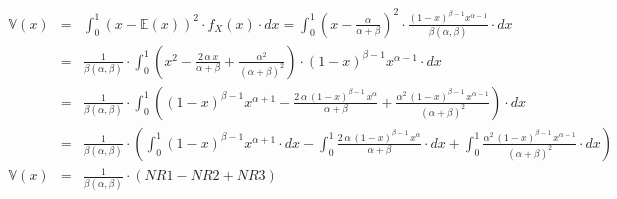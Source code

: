 \begin{uebsp}
\begin{Answer}
\begin{enumerate}[i)]
            \begin{eqnarray*}
                \mathbb{V}(x) &=& \int_{0}^1 (x-\mathbb{E}(x))^2\cdot f_X(x)\cdot dx = \int_{0}^1 \left(x-\frac{\alpha}{\alpha+\beta}\right)^2\cdot \frac{(1-x)^{\beta-1} x^{\alpha-1}}{\beta(\alpha, \beta)}\cdot dx \\
                 &=& \frac{1}{\beta(\alpha, \beta)}\cdot \int_{0}^1 \left(x^2-\frac{2\,\alpha\,x}{\alpha+\beta} + \frac{\alpha^2}{(\alpha+\beta)^2}\right)\cdot (1-x)^{\beta-1} x^{\alpha-1}\cdot dx \\
                 &=& \frac{1}{\beta(\alpha, \beta)}\cdot \int_{0}^1\left((1-x)^{\beta-1} x^{\alpha+1} - \frac{2\,\alpha\,(1-x)^{\beta-1}\,x^{\alpha}}{\alpha+\beta} + \frac{\alpha^2\,(1-x)^{\beta-1}\,x^{\alpha-1}}{(\alpha+\beta)^2} \right)\cdot dx \\
                 &=& \frac{1}{\beta(\alpha, \beta)}\cdot \left(\int_{0}^1(1-x)^{\beta-1} x^{\alpha+1}\cdot dx - \int_{0}^1\frac{2\,\alpha\,(1-x)^{\beta-1}\,x^{\alpha}}{\alpha+\beta}\cdot dx + \int_{0}^1\frac{\alpha^2\,(1-x)^{\beta-1}\,x^{\alpha-1}}{(\alpha+\beta)^2}\cdot dx \right)\\
                \mathbb{V}(x) &=& \frac{1}{\beta(\alpha, \beta)}\cdot \left(NR1 - NR2 + NR3 \right)
            \end{eqnarray*}


\end{enumerate}
\end{Answer}
\end{uebsp}
